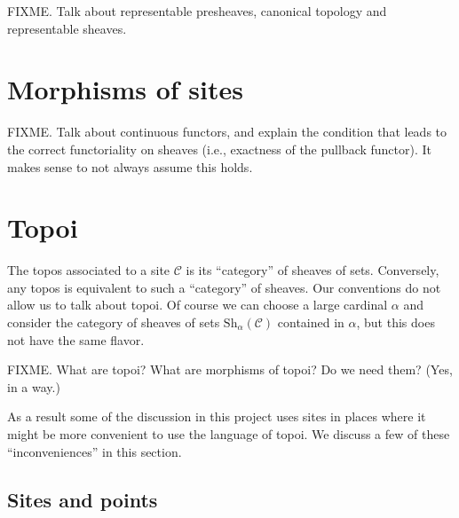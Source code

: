 \documentclass{amsart}
\theoremstyle{definition}
\theoremstyle{remark}
\numberwithin{equation}{subsection}
\begin{document}
\noindent
FIXME. Talk about representable presheaves, canonical topology and
representable sheaves.

\section{Morphisms of sites}
\label{section-morphism-sites}

\noindent
FIXME. Talk about continuous functors, and explain the condition that leads to
the correct functoriality on sheaves (i.e., exactness of the pullback functor).
It makes sense to not always assume this holds.

\section{Topoi}

\noindent
The topos associated to a site $\mathcal{C}$ is its ``category'' of sheaves of
sets. Conversely, any topos is equivalent to such a ``category'' of sheaves.
Our conventions do not allow us to talk about topoi. Of course we can choose a
large cardinal $\alpha$ and consider the category of sheaves of sets
$\text{Sh}_\alpha(\mathcal{C})$ contained in $\alpha$, but this does not have
the same flavor.

\smallskip\noindent
FIXME. What are topoi? What are morphisms of topoi? Do we need them? (Yes, in a
way.)

\smallskip\noindent
As a result some of the discussion in this project uses sites in places where
it might be more convenient to use the language of topoi. We discuss a few
of these ``inconveniences'' in this section.

\subsection{Sites and points}
\label{subsection-points}
\end{document}
